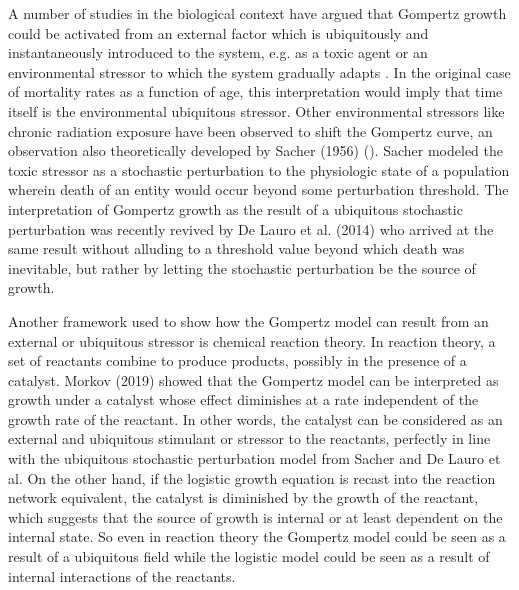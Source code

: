 \documentclass{article}
\begin{document}
A number of studies in the biological context have argued that Gompertz growth could be activated from an external factor which is ubiquitously and instantaneously introduced to the system, e.g. as a toxic agent or an environmental stressor to which the system gradually adapts \cite{neafsey1988gompertz,neafsey1989gompertz,thompson1990biphasic}. In the original case of mortality rates as a function of age, this interpretation would imply that time itself is the environmental ubiquitous stressor. Other environmental stressors like chronic radiation exposure have been observed to shift the Gompertz curve, an observation also theoretically developed by Sacher (1956) (\cite{sacher1956statistical}). Sacher modeled the toxic stressor as a stochastic perturbation to the physiologic state of a population wherein death of an entity would occur beyond some perturbation threshold. The interpretation of Gompertz growth as the result of a ubiquitous stochastic perturbation was recently revived by De Lauro et al. (2014) \cite{de2014stochastic} who arrived at the same result without alluding to a threshold value beyond which death was inevitable, but rather by letting the stochastic perturbation be the source of growth.

Another framework used to show how the Gompertz model can result from an external or ubiquitous stressor is chemical reaction theory. In reaction theory, a set of reactants combine to produce products, possibly in the presence of a catalyst. Morkov (2019) \cite{markov2019reaction} showed that the Gompertz model can be interpreted as growth under a catalyst whose effect diminishes at a rate independent of the growth rate of the reactant. In other words, the catalyst can be considered as an external and ubiquitous stimulant or stressor to the reactants, perfectly in line with the ubiquitous stochastic perturbation model from Sacher and De Lauro et al. On the other hand, if the logistic growth equation is recast into the reaction network equivalent, the catalyst is diminished by the growth of the reactant, which suggests that the source of growth is internal or at least dependent on the internal state. So even in reaction theory the Gompertz model could be seen as a result of a ubiquitous field while the logistic model could be seen as a result of internal interactions of the reactants. 
\end{document}
